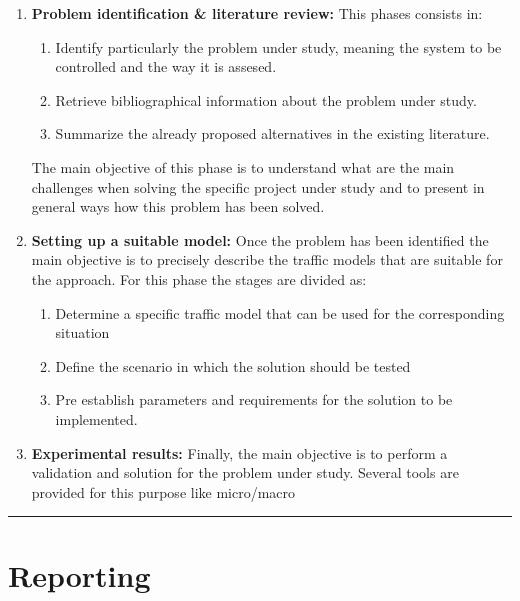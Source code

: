 \documentclass[]{book}
\providecommand{\tightlist}{%
  \setlength{\itemsep}{0pt}\setlength{\parskip}{0pt}}
\theoremstyle{definition}
\theoremstyle{definition}
\theoremstyle{definition}
\theoremstyle{remark}
\begin{document}
\begin{enumerate}
\def\labelenumi{\arabic{enumi}.}
\item
  \textbf{Problem identification \& literature review:} This phases
  consists in:

  \begin{enumerate}
  \def\labelenumii{\arabic{enumii}.}
  \item
    Identify particularly the problem under study, meaning the system to
    be controlled and the way it is assesed.
  \item
    Retrieve bibliographical information about the problem under study.
  \item
    Summarize the already proposed alternatives in the existing
    literature.
  \end{enumerate}

  The main objective of this phase is to understand what are the main
  challenges when solving the specific project under study and to
  present in general ways how this problem has been solved.
\item
  \textbf{Setting up a suitable model:} Once the problem has been
  identified the main objective is to precisely describe the traffic
  models that are suitable for the approach. For this phase the stages
  are divided as:

  \begin{enumerate}
  \def\labelenumii{\arabic{enumii}.}
  \tightlist
  \item
    Determine a specific traffic model that can be used for the
    corresponding situation
  \item
    Define the scenario in which the solution should be tested
  \item
    Pre establish parameters and requirements for the solution to be
    implemented.
  \end{enumerate}
\item
  \textbf{Experimental results:} Finally, the main objective is to
  perform a validation and solution for the problem under study. Several
  tools are provided for this purpose like micro/macro
\end{enumerate}

\begin{center}\rule{0.5\linewidth}{\linethickness}\end{center}

\hypertarget{reporting}{%
\section*{Reporting}\label{reporting}}
\end{document}
